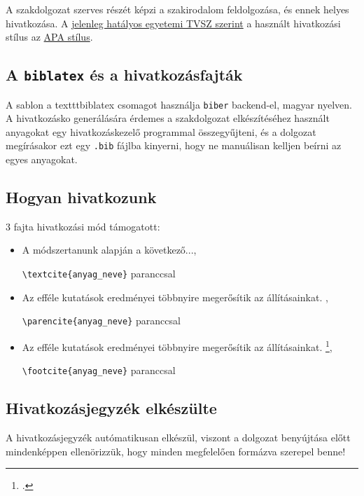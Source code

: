 A szakdolgozat szerves részét képzi a szakirodalom feldolgozása, és ennek helyes hivatkozása. A \href{https://www.uni-corvinus.hu/downloads/98n7.tnm69v/hkr-3-tvsz-2024-szeptember-1-00-alairt-1.pdf}{jelenleg hatályos egyetemi TVSZ szerint} a használt hivatkozási stílus az \href{https://apastyle.apa.org/}{APA stílus}.

\subsection{A \texttt{biblatex} és a hivatkozásfajták}

A sablon a texttt{biblatex} csomagot használja \texttt{biber} backend-el, magyar nyelven. A hivatkozásko generálására érdemes a szakdolgozat elkészítéséhez használt anyagokat egy hivatkozáskezelő programmal összegyűjteni, és a dolgozat megírásakor ezt egy \texttt{.bib} fájlba kinyerni, hogy ne manuálisan kelljen beírni az egyes anyagokat. 

\subsection{Hogyan hivatkozunk}

3 fajta hivatkozási mód támogatott:

\begin{itemize}
    \item A módszertanunk \textcite{fama_five-factor_2015} alapján a következő..., \par \texttt{\textbackslash textcite\{anyag\_neve\}} paranccsal
    \item Az efféle kutatások eredményei többnyire megerősítik az állításainkat. \parencite{fama_five-factor_2015}, \par \texttt{\textbackslash parencite\{anyag\_neve\}} paranccsal
    \item Az efféle kutatások eredményei többnyire megerősítik az állításainkat. \footcite{fama_five-factor_2015}, \par \texttt{\textbackslash footcite\{anyag\_neve\}} paranccsal
\end{itemize}

\subsection{Hivatkozásjegyzék elkészülte}

A hivatkozásjegyzék autómatikusan elkészül, viszont a dolgozat benyújtása előtt mindenképpen ellenörizzük, hogy minden megfelelően formázva szerepel benne!

